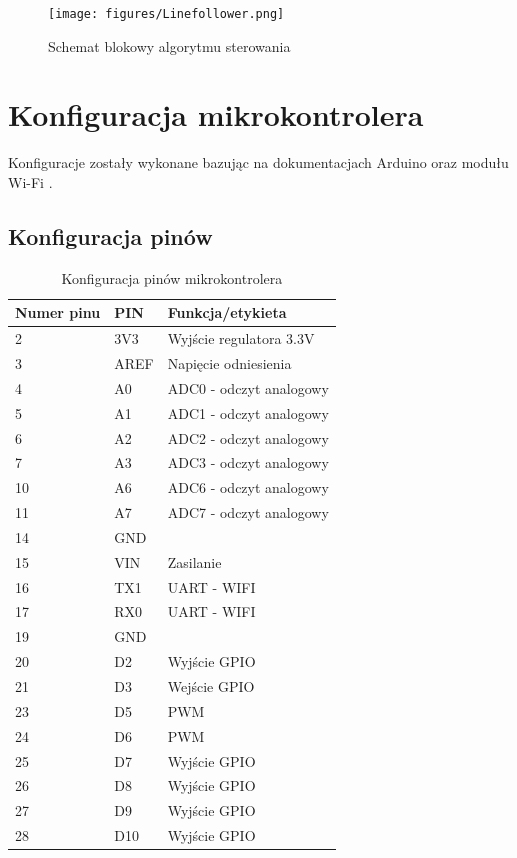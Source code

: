 \documentclass[10pt, a4paper]{article}
\begin{document}
\begin{figure}[H]
	\centering
	\texttt{[image: figures/Linefollower.png]}
	\caption{Schemat blokowy algorytmu sterowania}
	\label{fig:schematBlokowy}
\end{figure}
\newpage
\section{Konfiguracja mikrokontrolera}


Konfiguracje zostały wykonane bazując na dokumentacjach Arduino \cite{dok1} oraz modułu Wi-Fi \cite{dok2}.


\subsection{Konfiguracja pinów}

\begin{table}[H]
	\centering
	\begin{tabular}{|l|l|l|}
		\hline
		Numer pinu	&	PIN & Funkcja/etykieta\\
		\hline
		2&	3V3 & Wyjście regulatora 3.3V\\
		3&	AREF & Napięcie odniesienia\\
		4&	A0 & ADC0 - odczyt analogowy\\
		5&	A1 & ADC1 - odczyt analogowy\\
		6&	A2 & ADC2 - odczyt analogowy\\
		7&	A3 & ADC3 - odczyt analogowy\\
		10&	A6 & ADC6 - odczyt analogowy\\
		11&	A7 & ADC7 - odczyt analogowy \\
		14&	GND&  \\
		15&	VIN&   Zasilanie \\
		16&	TX1&    UART - WIFI\\
		17&	RX0&	UART - WIFI\\
		19&	GND&	\\
		20&	D2& Wyjście GPIO	\\
		21&	D3&	Wejście GPIO\\
		23&	D5&	PWM\\
		24&	D6&	PWM\\
		25&	D7&	Wyjście GPIO\\
		26&	D8&	Wyjście GPIO\\
		27&	D9&	Wyjście GPIO\\
		28&	D10&	Wyjście GPIO\\
	
		\hline
	\end{tabular}
	\caption{Konfiguracja pinów mikrokontrolera}
	
\end{table}
\end{document}
